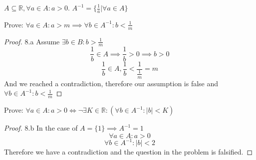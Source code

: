 \documentclass[12pt]{article}
\newenvironment{problem}[2][Problem]{\begin{trivlist}
\item[\hskip \labelsep {\bfseries #1}\hskip \labelsep {\bfseries #2.}]}{\end{trivlist}}
\begin{document}
\begin{problem}{8}
	$A \subseteq \mathbb{R}, \forall a \in A: a > 0.$ \newline
	$ A^{-1} = \{\frac{1}{a}|\forall a \in A\}$
\end{problem}

\begin{problem}{8.a}
	Prove: $\forall a \in A : a > m \implies \forall b \in A^{-1}: b < \frac{1}{m}$
\end{problem}

\begin{proof}{8.a}
	Assume $\exists b \in B: b > \frac{1}{m}$
	$$\frac{1}{b} \in A \implies \frac{1}{b} > 0 \implies b > 0$$
	$$\frac{1}{b} \in A, \frac{1}{b} < \frac{1}{\frac{1}{m}} = m$$
	And we reached a contradiction, therefore our assumption is false and $\forall b \in A^{-1}: b < \frac{1}{m}$
\end{proof}

\begin{problem}{8.b}
	Prove: $\forall a \in A: a > 0 \iff \lnot \exists K \in \mathbb{R}: (\forall b \in A^{-1}: |b| < K)$
\end{problem}

\begin{proof}{8.b}
	In the case of $A = \{1\} \implies A^{-1} = 1$
	$$\forall a \in A : a > 0$$
	$$\forall b \in A^{-1}: |b| < 2$$
	Therefore we have a contradiction and the question in the problem is falsified.
\end{proof}
\end{document}

